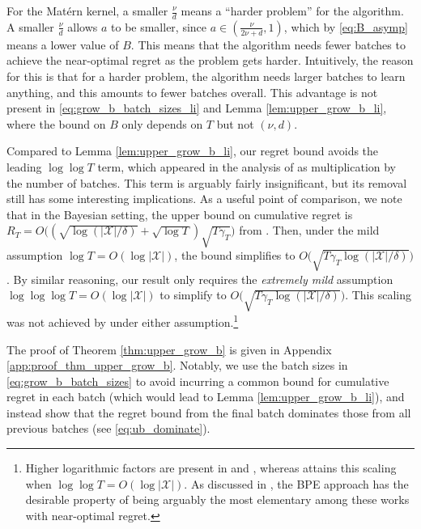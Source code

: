 \documentclass[10pt]{article}
\begin{document}
    \begin{remark}
    For the Mat\'ern kernel, a smaller $\frac{\nu}{d}$ means a ``harder problem'' for the algorithm.  A smaller $\frac{\nu}{d}$ allows $a$ to be smaller, since $a\in(\frac{\nu}{2\nu+d}, 1)$, which by \eqref{eq:B_asymp} means a lower value of $B$. This means that the algorithm needs fewer batches to achieve the near-optimal regret as the problem gets harder.  Intuitively, the reason for this is that for a harder problem, the algorithm needs larger batches to learn anything, and this amounts to fewer batches overall. 
    This advantage is not present in \eqref{eq:grow_b_batch_sizes_li} and Lemma \ref{lem:upper_grow_b_li}, where the bound on $B$ only depends on $T$ but not $(\nu, d)$.
\end{remark}
\begin{remark}
    Compared to Lemma \ref{lem:upper_grow_b_li}, our regret bound avoids the leading $\log\log T$ term, which appeared in the analysis of \citep{Li22} as multiplication by the number of batches.  
    This term is arguably fairly insignificant, but its removal still has some interesting implications.  
    As a useful point of comparison, we note that in the Bayesian setting, the upper bound on cumulative regret is $R_T = O\bigl((\sqrt{\log (\lvert \mathcal{X}\rvert/\delta) } + \sqrt{\log T})\sqrt{T\gamma_T}\bigr) $ from \citep{Srinivas10}. Then, under the mild assumption $\log T = O(\log\lvert \mathcal{X}\rvert)$,
    the bound simplifies to $O\bigl(\sqrt{T\gamma_T\log(\lvert \mathcal{X}\rvert/\delta)} \bigr)$.  By similar reasoning, our result only requires the \emph{extremely mild} assumption 
    $\log\log\log T = O(\log\lvert \mathcal{X}\rvert)$
    to simplify to $O\bigl(\sqrt{T\gamma_T\log(\lvert \mathcal{X}\rvert/\delta)} \bigr)$. This scaling was not achieved by \cite{Li22} under either assumption.\footnote{Higher logarithmic factors are present in \citep{Valko13} and \citep{Salgia21}, whereas \citep{Camilleri21} attains this scaling when $\log\log T = O(\log\lvert \mathcal{X}\rvert)$.   As discussed in \citep{Li22}, the BPE approach has the desirable property of being arguably the most elementary among these works with near-optimal regret. }
\end{remark}

The proof of Theorem \ref{thm:upper_grow_b} is given in Appendix \ref{app:proof_thm_upper_grow_b}.  
Notably, we use the batch sizes in \eqref{eq:grow_b_batch_sizes} to avoid incurring a common bound for cumulative regret in each batch (which would lead to Lemma \ref{lem:upper_grow_b_li}), and instead show that the regret bound from the final batch dominates those from all previous batches (see \eqref{eq:ub_dominate}).
\end{document}
